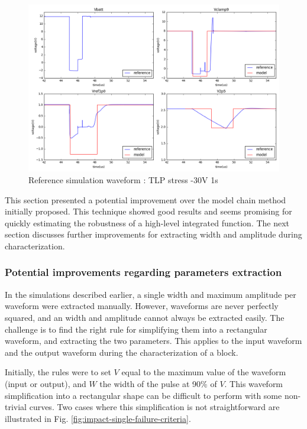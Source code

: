 \begin{figure}[!h]
  \centering
  \includegraphics[width=\textwidth]{src/4/figures/total_simulation_30V_1u_V2.png}
  \caption{Reference simulation waveform : TLP stress -30V 1\textmugreek{}s }
  \label{fig:reference_simu_v2}
\end{figure}

This section presented a potential improvement over the model chain method initially proposed.
This technique showed good results and seems promising for quickly estimating the robustness of a high-level integrated function.
The next section discusses further improvements for extracting width and amplitude during characterization.

\subsubsection{Potential improvements regarding parameters extraction}

In the simulations described earlier, a single width and maximum amplitude per waveform were extracted manually.
However, waveforms are never perfectly squared, and an width and amplitude cannot always be extracted easily.
The challenge is to find the right rule for simplifying them into a rectangular waveform, and extracting the two parameters.
This applies to the input waveform and the output waveform during the characterization of a block.

Initially, the rules were to set $V$ equal to the maximum value of the waveform (input or output), and $W$ the width of the pulse at 90\% of $V$.
This waveform simplification into a rectangular shape can be difficult to perform with some non-trivial curves.
Two cases where this simplification is not straightforward are illustrated in Fig. \ref{fig:impact-single-failure-criteria}.

